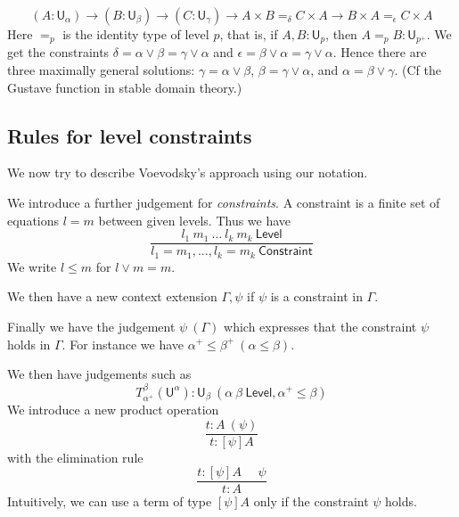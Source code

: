 \documentclass[11pt,a4paper]{article}
\def\UU{\mathsf{U}}
\def\Level{\mathsf{Level}}
\def\Constraint{\mathsf{Constraint}}
\begin{document}

%
$$
    (A : \UU_\alpha) \to (B : \UU_\beta) \to (C : \UU_\gamma) \to A \times B =_\delta C \times A \to B \times A =_\epsilon C \times A
$$
Here $=_p$ is the identity type of level $p$, that is, if $A, B : \UU_p$, then 
$A =_p B : \UU_{p^+}$.
We get the constraints
$
    \delta = \alpha \vee \beta = \gamma \vee \alpha
$
and 
$
    \epsilon = \beta \vee \alpha = \gamma \vee \alpha.
$
Hence there are three maximally general solutions: $\gamma = \alpha \vee \beta$, $\beta = \gamma \vee \alpha$, and $\alpha = \beta \vee \gamma$. (Cf the Gustave function in stable domain theory.)


\subsection{Rules for level constraints}

We now try to describe Voevodsky's approach \cite{VV} using our notation.

We introduce a further judgement for {\em constraints}. A constraint is
a finite set of equations $l = m$ between given levels. Thus we have
$$
\frac{l_1~m_1~\dots~l_k~m_k~\Level}{l_1 = m_1,\dots,l_k = m_k~\Constraint}
$$
We write $l\leqslant m$ for $l\vee m = m$.

We then have a new context extension $\Gamma,\psi$ if $\psi$ is a constraint in $\Gamma$.

Finally we have the judgement $\psi~(\Gamma)$ which expresses that the constraint $\psi$
holds in $\Gamma$. For instance we have $\alpha^+\leqslant\beta^+~(\alpha\leqslant\beta)$.

We then have judgements such as
$$
T_{\alpha^+}^{\beta}(\UU^{\alpha}):\UU_{\beta}~(\alpha~\beta~\Level,\alpha^+\leqslant\beta)
$$
We introduce a new product operation
$$
\frac{t:A~(\psi)}{t:[\psi]A}
$$
with the elimination rule
$$
\frac{t:[\psi]A~~~~~~\psi}{t:A}
$$
Intuitively, we can use a term of type $[\psi]A$ only if the constraint $\psi$ holds.
\end{document}
